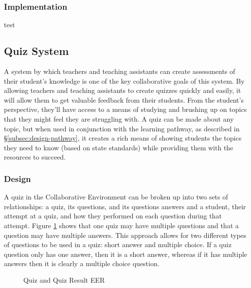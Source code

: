 \subsubsection{Implementation}
test

\subsection{Quiz System}
\label{subsec:design-quiz}
A system by which teachers and teaching assistants can create assessments of their student's knowledge is one of the key collaborative goals of this system. By allowing teachers and teaching assistants to create quizzes quickly and easily, it will allow them to get valuable feedback from their students. From the student's perspective, they'll have access to a means of studying and brushing up on topics that they might feel they are struggling with. A quiz can be made about any topic, but when used in conjunction with the learning pathway, as described in \S \ref{subsec:design-pathway}, it creates a rich means of showing students the topics they need to know (based on state standards) while providing them with the resources to succeed.

\subsubsection{Design}
A quiz in the Collaborative Environment can be broken up into two sets of relationships: a quiz, its questions, and its questions answers and a student, their attempt at a quiz, and how they performed on each question during that attempt. Figure \ref{fig:er-quiz} shows that one quiz may have multiple questions and that a question may have multiple answers. This approach allows for two different types of questions to be used in a quiz: short answer and multiple choice. If a quiz question only has one answer, then it is a short answer, whereas if it has multiple answers then it is clearly a multiple choice question.

\begin{figure}[h!]
	\centering
	\caption{Quiz and Quiz Result EER}
	\label{fig:er-quiz}
\end{figure}

